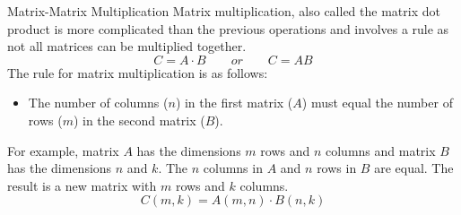 \documentclass{beamer}
\begin{document}
\begin{frame}
\begin{block}{Matrix-Matrix Multiplication}
    Matrix multiplication, also called the matrix dot product is more complicated than the previous operations and involves a rule as not all matrices can be multiplied together.
    	\begin{equation*}
    		C = A \cdot B \qquad or \qquad C = AB
    	\end{equation*}
    The rule for matrix multiplication is as follows:
    \begin{itemize}
    	\item The number of columns ($n$) in the first matrix ($A$) must equal the number of rows ($m$) in the second matrix ($B$).
    \end{itemize}
    For example, matrix $A$ has the dimensions $m$ rows and $n$ columns and matrix $B$ has the dimensions $n$ and $k$. The $n$ columns in $A$ and $n$ rows in $B$ are equal. The result is a new matrix with $m$ rows and $k$ columns.
    	\begin{equation*}
    		C(m, k) = A(m, n) \cdot B(n, k)
    	\end{equation*}
\end{block}
\end{frame}
\end{document}
